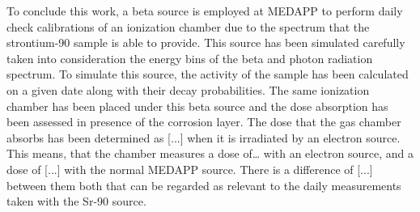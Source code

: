 To conclude this work, a beta source is employed at MEDAPP to perform daily check calibrations of an ionization chamber due to the spectrum that the strontium-90 sample is able to provide. This source has been simulated carefully taken into consideration the energy bins of the beta and photon radiation spectrum. To simulate this source, the activity of the sample has been calculated on a given date along with their decay probabilities. The same ionization chamber has been placed under this beta source and the dose absorption has been assessed in presence of the corrosion layer. The dose that the gas chamber absorbs has been determined as [...] when it is irradiated by an electron source. This means, that the chamber measures a dose of… with an electron source, and a dose of [...] with the normal MEDAPP source. There is a difference of [...] between them both that can be regarded as relevant to the daily measurements taken with the Sr-90 source. 



